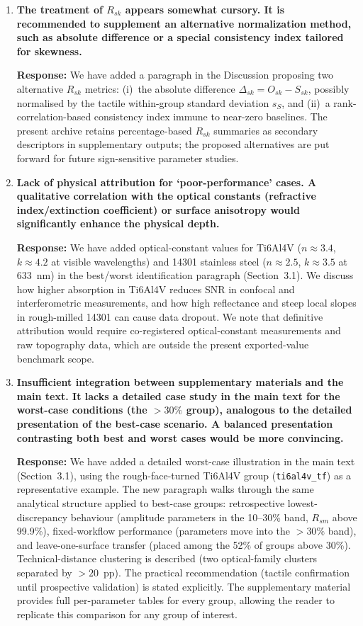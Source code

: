 \documentclass[10pt]{article}
\begin{document}
\begin{enumerate}[leftmargin=*, label=\textbf{Comment \arabic*.}, ref=\arabic*]

\item \textbf{The treatment of $R_{sk}$ appears somewhat cursory. It is recommended to supplement an alternative normalization method, such as absolute difference or a special consistency index tailored for skewness.}

\textbf{Response:} We have added a paragraph in the Discussion proposing two alternative $R_{sk}$ metrics: (i)~the absolute difference $\Delta_{sk} = O_{sk} - S_{sk}$, possibly normalised by the tactile within-group standard deviation $s_S$, and (ii)~a rank-correlation-based consistency index immune to near-zero baselines. The present archive retains percentage-based $R_{sk}$ summaries as secondary descriptors in supplementary outputs; the proposed alternatives are put forward for future sign-sensitive parameter studies.

\item \textbf{Lack of physical attribution for `poor-performance' cases. A qualitative correlation with the optical constants (refractive index/extinction coefficient) or surface anisotropy would significantly enhance the physical depth.}

\textbf{Response:} We have added optical-constant values for Ti6Al4V ($n \approx 3.4$, $k \approx 4.2$ at visible wavelengths) and 14301 stainless steel ($n \approx 2.5$, $k \approx 3.5$ at 633~nm) in the best/worst identification paragraph (Section~3.1). We discuss how higher absorption in Ti6Al4V reduces SNR in confocal and interferometric measurements, and how high reflectance and steep local slopes in rough-milled 14301 can cause data dropout. We note that definitive attribution would require co-registered optical-constant measurements and raw topography data, which are outside the present exported-value benchmark scope.

\item \textbf{Insufficient integration between supplementary materials and the main text. It lacks a detailed case study in the main text for the worst-case conditions (the $>30\%$ group), analogous to the detailed presentation of the best-case scenario. A balanced presentation contrasting both best and worst cases would be more convincing.}

\textbf{Response:} We have added a detailed worst-case illustration in the main text (Section~3.1), using the rough-face-turned Ti6Al4V group (\texttt{ti6al4v\_tf}) as a representative example. The new paragraph walks through the same analytical structure applied to best-case groups: retrospective lowest-discrepancy behaviour (amplitude parameters in the 10--30\% band, $R_{sm}$ above 99.9\%), fixed-workflow performance (parameters move into the $>30\%$ band), and leave-one-surface transfer (placed among the 52\% of groups above 30\%). Technical-distance clustering is described (two optical-family clusters separated by $>20$~pp). The practical recommendation (tactile confirmation until prospective validation) is stated explicitly. The supplementary material provides full per-parameter tables for every group, allowing the reader to replicate this comparison for any group of interest.


\end{enumerate}
\end{document}
